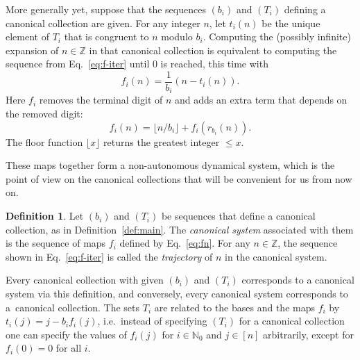 \documentclass[12pt]{article}
\theoremstyle{definition}
\newtheorem{definition}{Definition}
\newcommand{\N}{\mathbb{N}}
\newcommand{\Z}{\mathbb{Z}}
\begin{document}
More generally yet, suppose that the sequences $(b_i)$ and $(T_i)$ defining a canonical collection are given. For any integer $n$, let $t_i(n)$ be the unique element of $T_i$ that is congruent to $n$ modulo $b_i$.
Computing the (possibly infinite) expansion of $n\in\Z$ in that canonical collection is equivalent to computing the sequence from Eq.~\eqref{eq:f-iter} until $0$ is reached, this time with
\begin{equation}
\label{eq:fn}
f_i(n) = \frac{1}{b_i}\left(n - t_i(n)\right).
\end{equation}
Here $f_i$ removes the terminal digit of $n$ and adds an extra term that depends on the removed digit: 
\begin{equation}
\label{eq:fn2}
f_i(n) = \lfloor n/b_i \rfloor + f_i(r_{b_i}(n)).
\end{equation}
The floor function $\lfloor x\rfloor$ returns the greatest integer $\leqslant x$.

These maps together form a non-autonomous dynamical system, which is the point of view on the canonical collections that will be convenient for us from now on.
\begin{definition}
Let $(b_i)$ and $(T_i)$ be sequences that define a canonical collection, as in Definition~\ref{def:main}. The \emph{canonical system} associated with them is the sequence of maps $f_i$ defined by Eq.~\eqref{eq:fn}. For any $n\in\Z$, the sequence shown in Eq.~\eqref{eq:f-iter} is called the \emph{trajectory} of $n$ in the canonical system.
\end{definition}

Every canonical collection with given $(b_i)$ and $(T_i)$ corresponds to a canonical system via this definition, and conversely, every canonical system corresponds to a~canonical collection. The sets $T_i$ are related to the bases and the maps $f_i$ by $ t_i(j) = j-b_i f_i(j) $, i.e.\ instead of specifying $(T_i)$ for a canonical collection one can specify the values of $f_i(j)$ for $i\in\N_0$ and $j\in[n]$ arbitrarily, except for $f_i(0)=0$ for all $i$.
\end{document}
